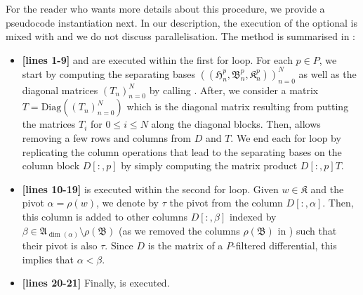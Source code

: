 \documentclass[11pt, table, nothms]{amsart}
\theoremstyle{definition}
\newcommand{\fA}{\mathfrak{A}}
\newcommand{\fB}{\mathfrak{B}}
\newcommand{\fH}{\mathfrak{H}}
\newcommand{\fK}{\mathfrak{K}}
\begin{document}
{
 
For the reader who wants more details about this procedure, we provide a pseudocode instantiation next.
In our description, the execution of the optional  is mixed with  and we do not discuss parallelisation. The method is summarised in :
\begin{itemize}
    \item \textbf{[lines 1-9]}  and  are executed within the first for loop.
    For each $p \in P$, we start by computing the separating bases $((\fH^p_n, \fB^p_n, \fK^p_n))_{n=0}^N$ as well as the diagonal matrices $(T_n)_{n=0}^N$ by calling . After, we consider a matrix $T=\textrm{Diag}((T_n)_{n=0}^N)$ which is the diagonal matrix resulting from putting the matrices $T_i$ for $0 \leq i \leq N$ along the diagonal blocks. 
    Then,  allows removing a few rows and columns from $D$ and $T$. 
    We end each for loop by replicating the column operations that lead to the separating bases on the column block $D[:,p]$ by simply computing the matrix product $D[:,p]T$. 

    
    \item \textbf{[lines 10-19]}  is executed within the second for loop. Given $w \in \fK$ and the pivot $\alpha = \rho(w)$, we denote by $\tau$ the pivot from the column $D[:,\alpha]$. 
    Then, this column is added to other columns $D[:,\beta]$ indexed by $\beta \in \fA_{\dim(\alpha)} \setminus \rho (\fB)$ (as we removed the columns $\rho (\fB)$ in )  such that their pivot is also $\tau$. 
    Since $D$ is the matrix of a $P$-filtered differential, this implies that $\alpha < \beta$. 
    \item \textbf{[lines 20-21]} Finally,  is executed.
\end{itemize}

}
\end{document}
